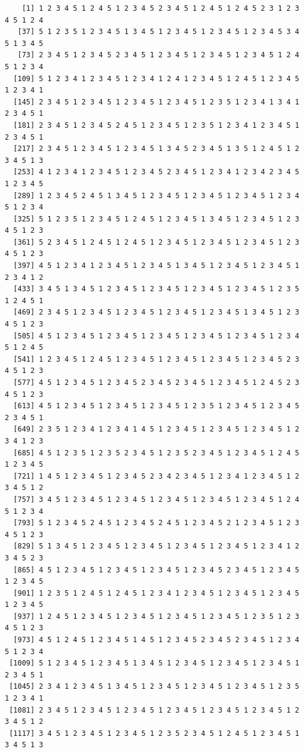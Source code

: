 \documentclass[
  english,
]{book}
\begin{document}
\begin{verbatim}
    [1] 1 2 3 4 5 1 2 4 5 1 2 3 4 5 2 3 4 5 1 2 4 5 1 2 4 5 2 3 1 2 3 4 5 1 2 4
   [37] 5 1 2 3 5 1 2 3 4 5 1 3 4 5 1 2 3 4 5 1 2 3 4 5 1 2 3 4 5 3 4 5 1 3 4 5
   [73] 2 3 4 5 1 2 3 4 5 2 3 4 5 1 2 3 4 5 1 2 3 4 5 1 2 3 4 5 1 2 4 5 1 2 3 4
  [109] 5 1 2 3 4 1 2 3 4 5 1 2 3 4 1 2 4 1 2 3 4 5 1 2 4 5 1 2 3 4 5 1 2 3 4 1
  [145] 2 3 4 5 1 2 3 4 5 1 2 3 4 5 1 2 3 4 5 1 2 3 5 1 2 3 4 1 3 4 1 2 3 4 5 1
  [181] 2 3 4 5 1 2 3 4 5 2 4 5 1 2 3 4 5 1 2 3 5 1 2 3 4 1 2 3 4 5 1 2 3 4 5 1
  [217] 2 3 4 5 1 2 3 4 5 1 2 3 4 5 1 3 4 5 2 3 4 5 1 3 5 1 2 4 5 1 2 3 4 5 1 3
  [253] 4 1 2 3 4 1 2 3 4 5 1 2 3 4 5 2 3 4 5 1 2 3 4 1 2 3 4 2 3 4 5 1 2 3 4 5
  [289] 1 2 3 4 5 2 4 5 1 3 4 5 1 2 3 4 5 1 2 3 4 5 1 2 3 4 5 1 2 3 4 5 1 2 3 4
  [325] 5 1 2 3 5 1 2 3 4 5 1 2 4 5 1 2 3 4 5 1 3 4 5 1 2 3 4 5 1 2 3 4 5 1 2 3
  [361] 5 2 3 4 5 1 2 4 5 1 2 4 5 1 2 3 4 5 1 2 3 4 5 1 2 3 4 5 1 2 3 4 5 1 2 3
  [397] 4 5 1 2 3 4 1 2 3 4 5 1 2 3 4 5 1 3 4 5 1 2 3 4 5 1 2 3 4 5 1 2 3 4 1 2
  [433] 3 4 5 1 3 4 5 1 2 3 4 5 1 2 3 4 5 1 2 3 4 5 1 2 3 4 5 1 2 3 5 1 2 4 5 1
  [469] 2 3 4 5 1 2 3 4 5 1 2 3 4 5 1 2 3 4 5 1 2 3 4 5 1 3 4 5 1 2 3 4 5 1 2 3
  [505] 4 5 1 2 3 4 5 1 2 3 4 5 1 2 3 4 5 1 2 3 4 5 1 2 3 4 5 1 2 3 4 5 1 2 4 5
  [541] 1 2 3 4 5 1 2 4 5 1 2 3 4 5 1 2 3 4 5 1 2 3 4 5 1 2 3 4 5 2 3 4 5 1 2 3
  [577] 4 5 1 2 3 4 5 1 2 3 4 5 2 3 4 5 2 3 4 5 1 2 3 4 5 1 2 4 5 2 3 4 5 1 2 3
  [613] 4 5 1 2 3 4 5 1 2 3 4 5 1 2 3 4 5 1 2 3 5 1 2 3 4 5 1 2 3 4 5 2 3 4 5 1
  [649] 2 3 5 1 2 3 4 1 2 3 4 1 4 5 1 2 3 4 5 1 2 3 4 5 1 2 3 4 5 1 2 3 4 1 2 3
  [685] 4 5 1 2 3 5 1 2 3 5 2 3 4 5 1 2 3 5 2 3 4 5 1 2 3 4 5 1 2 4 5 1 2 3 4 5
  [721] 1 4 5 1 2 3 4 5 1 2 3 4 5 2 3 4 2 3 4 5 1 2 3 4 1 2 3 4 5 1 2 3 4 5 1 2
  [757] 3 4 5 1 2 3 4 5 1 2 3 4 5 1 2 3 4 5 1 2 3 4 5 1 2 3 4 5 1 2 4 5 1 2 3 4
  [793] 5 1 2 3 4 5 2 4 5 1 2 3 4 5 2 4 5 1 2 3 4 5 2 1 2 3 4 5 1 2 3 4 5 1 2 3
  [829] 5 1 3 4 5 1 2 3 4 5 1 2 3 4 5 1 2 3 4 5 1 2 3 4 5 1 2 3 4 1 2 3 4 5 2 3
  [865] 4 5 1 2 3 4 5 1 2 3 4 5 1 2 3 4 5 1 2 3 4 5 2 3 4 5 1 2 3 4 5 1 2 3 4 5
  [901] 1 2 3 5 1 2 4 5 1 2 4 5 1 2 3 4 1 2 3 4 5 1 2 3 4 5 1 2 3 4 5 1 2 3 4 5
  [937] 1 2 4 5 1 2 3 4 5 1 2 3 4 5 1 2 3 4 5 1 2 3 4 5 1 2 3 5 1 2 3 4 5 1 2 3
  [973] 4 5 1 2 4 5 1 2 3 4 5 1 4 5 1 2 3 4 5 2 3 4 5 2 3 4 5 1 2 3 4 5 1 2 3 4
 [1009] 5 1 2 3 4 5 1 2 3 4 5 1 3 4 5 1 2 3 4 5 1 2 3 4 5 1 2 3 4 5 1 2 3 4 5 1
 [1045] 2 3 4 1 2 3 4 5 1 3 4 5 1 2 3 4 5 1 2 3 4 5 1 2 3 4 5 1 2 3 5 1 2 3 4 1
 [1081] 2 3 4 5 1 2 3 4 5 1 2 3 4 5 1 2 3 4 5 1 2 3 4 5 1 2 3 4 5 1 2 3 4 5 1 2
 [1117] 3 4 5 1 2 3 4 5 1 2 3 4 5 1 2 3 5 2 3 4 5 1 2 4 5 1 2 3 4 5 1 3 4 5 1 3

\end{verbatim}
\end{document}
